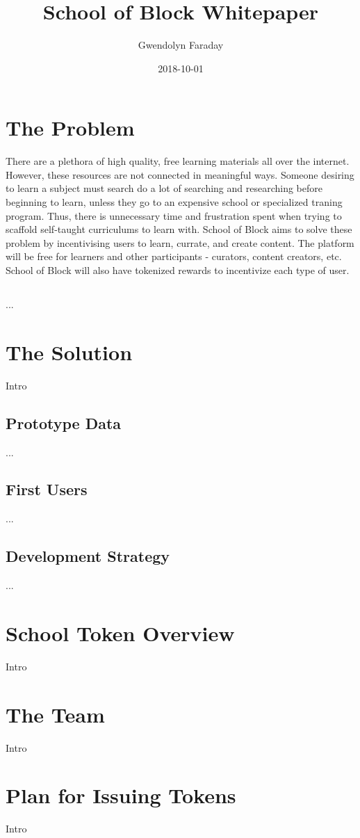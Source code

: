 \documentclass{article}
\title{School of Block Whitepaper}
\date{2018-10-01}
\author{Gwendolyn Faraday}
\begin{document}
  \maketitle
  \newpage

  \section{The Problem}

  There are a plethora of high quality, free learning materials all over the internet. However, these resources are not connected in meaningful ways. Someone desiring to learn a subject must search do a lot of searching and researching before beginning to learn, unless they go to an expensive school or specialized traning program. Thus, there is unnecessary time and frustration spent when trying to scaffold self-taught curriculums to learn with.
  School of Block aims to solve these problem by incentivising users to learn, currate, and create content. The platform will be free for learners and other participants - curators, content creators, etc. School of Block will also have tokenized rewards to incentivize each type of user.

  \subsection{}

  ...

  \section{The Solution}

  Intro

  \subsection{Prototype Data}

  ...

  \subsection{First Users}

  ...

  \subsection{Development Strategy}

  ...

  \section{School Token Overview}

  Intro

  \section{The Team}

  Intro

  \section{Plan for Issuing Tokens}

  Intro
\end{document}
